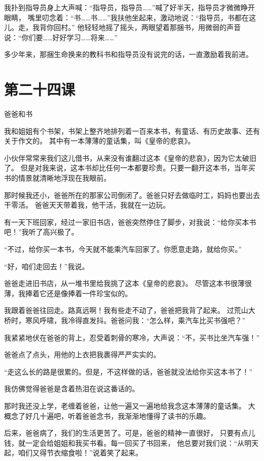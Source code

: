 \documentclass[12pt,UTF8]{ctexbook}
\begin{document}
我扑到指导员身上大声喊：“指导员，指导员……”喊了好半天，指导员才微微睁开眼睛，
嘴里叨念着：“书……书……”我扶他坐起来，激动地说：“指导员，书都在这儿。走，我背你回村。”
他轻轻地摇了摇头，两眼望着那捆书，用微弱的声音说：“你们要……好好学习……将来……”

多少年来，那捆生命换来的教科书和指导员没有说完的话，一直激励着我前进。

\section{第二十四课}

爸爸和书

我和姐姐有个书架，书架上整齐地排列着一百来本书，有童话、有历史故事、还有关于作文的。
其中有一本薄薄的童话集，叫《皇帝的悲哀》。

小伙伴常常来我们这儿借书，从来没有谁翻过这本《皇帝的悲哀》，因为它太破旧了。
但是对我来说，这本书却比任何一本都要珍贵。只要一翻开这本书，当年买书的情景就清晰地浮现在我眼前。

那时候我还小，爸爸所在的那家公司倒闭了。爸爸只好去做临时工，妈妈也要出去干零活。
爸爸天天带着我，他干活，我就在一边玩。

有一天下班回家，经过一家旧书店，爸爸突然停住了脚步，对我说：“给你买本书吧！”我听了高兴极了。

“不过，给你买一本书，今天就不能乘汽车回家了。你愿意走路，就给你买。”

“好，咱们走回去！”我说。

爸爸走进旧书店，从一堆书里给我挑了这本《皇帝的悲哀》。
尽管这本书很薄很薄，我捧着它还是像捧着一件珍宝似的。

我跟着爸爸往回走。路真远啊！我有些走不动了，爸爸把我背了起来。
过荒山大桥时，寒风呼啸，我冷得直发抖。爸爸问我：“怎么样，乘汽车比买书强吧？”

我紧紧地伏在爸爸的背上，忍受着刺骨的寒冷，大声说：“不，买书比坐汽车强！”

爸爸点了点头，用他的上衣把我裹得严严实实的。

“走这么长的路是很累的。但是，不这样做的话，爸爸就没法给你买这本书了！”

我仿佛觉得爸爸是含着热泪在说这番话的。

那时我还没上学，老缠着爸爸，让他一遍又一遍地给我念这本薄薄的童话集。
大概念了好几十遍吧，听着爸爸念书，我渐渐地懂得了读书的乐趣。

后来，爸爸病了，我们的生活更苦了。可是，爸爸的精神一直很好，
只要有点儿钱，就一定会给姐姐和我买书看。每一回买了书回来，
他总要对我们说：“从明天起，咱们又得节衣缩食啦！”说着笑了起来。
\end{document}
